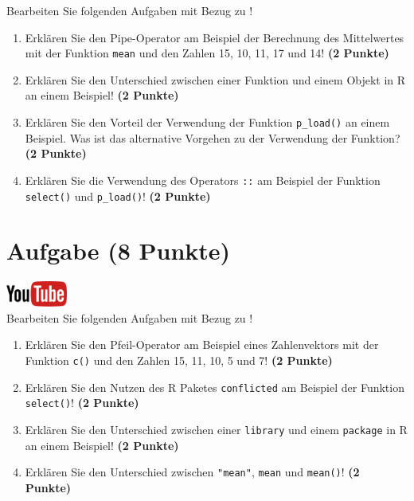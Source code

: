 \documentclass[a4paper, 10pt]{scrartcl}\usepackage[]{graphicx}\usepackage[]{xcolor}
\begin{document}
Bearbeiten Sie folgenden Aufgaben mit Bezug zu \Rlogo! 

\begin{enumerate}
\item Erkl{\"a}ren Sie den Pipe-Operator am Beispiel der Berechnung des Mittelwertes
mit der Funktion \texttt{mean} und den Zahlen 15, 10, 11, 17 und 14!  \textbf{(2 Punkte)} 
\item Erkl{\"a}ren Sie den Unterschied zwischen einer Funktion und einem Objekt
  in R an einem Beispiel! \textbf{(2 Punkte)} 
\item Erkl{\"a}ren Sie den Vorteil der Verwendung der Funktion \texttt{p\_load()} an
einem Beispiel. Was ist das alternative Vorgehen zu der Verwendung der
Funktion? \textbf{(2 Punkte)} 
\item Erkl{\"a}ren Sie die Verwendung des Operators \texttt{::} am Beispiel der
Funktion \texttt{select()} und \texttt{p\_load()}! \textbf{(2 Punkte)} 
\end{enumerate}


 
\clearpage

\section{Aufgabe \hfill (8 Punkte)}

\hfill\href{https://youtu.be/xP9xjcLIbDE}{\includegraphics[width =
  2cm]{img/youtube}}\\[1Ex]




Bearbeiten Sie folgenden Aufgaben mit Bezug zu \Rlogo! 

\begin{enumerate}
  \item Erkl{\"a}ren Sie den Pfeil-Operator am Beispiel eines Zahlenvektors mit der
Funktion \texttt{c()} und den Zahlen 15, 11, 10, 5 und 7! \textbf{(2 Punkte)}
\item Erkl{\"a}ren Sie den Nutzen des R Paketes \texttt{conflicted} am Beispiel der
  Funktion \texttt{select()}! \textbf{(2 Punkte)} 
\item Erkl{\"a}ren Sie den Unterschied zwischen einer \texttt{library} und
  einem \texttt{package} in R an einem Beispiel! \textbf{(2 Punkte)} 
\item Erkl{\"a}ren Sie den Unterschied zwischen \texttt{"mean"}, \texttt{mean}
  und \texttt{mean()}! \textbf{(2 Punkte)} 
\end{enumerate}
\end{document}
